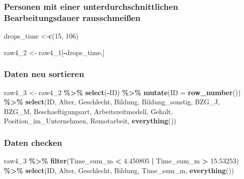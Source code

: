 \documentclass[
]{article}
\newenvironment{Shaded}{\begin{snugshade}}{\end{snugshade}}
\newcommand{\AttributeTok}[1]{\textcolor[rgb]{0.13,0.29,0.53}{#1}}
\newcommand{\DecValTok}[1]{\textcolor[rgb]{0.00,0.00,0.81}{#1}}
\newcommand{\FloatTok}[1]{\textcolor[rgb]{0.00,0.00,0.81}{#1}}
\newcommand{\FunctionTok}[1]{\textcolor[rgb]{0.13,0.29,0.53}{\textbf{#1}}}
\newcommand{\NormalTok}[1]{#1}
\newcommand{\OtherTok}[1]{\textcolor[rgb]{0.56,0.35,0.01}{#1}}
\newcommand{\SpecialCharTok}[1]{\textcolor[rgb]{0.81,0.36,0.00}{\textbf{#1}}}
\begin{document}
\subsubsection{Personen mit einer unterdurchschnittlichen
Bearbeitungsdauer
rausschmeißen}\label{personen-mit-einer-unterdurchschnittlichen-bearbeitungsdauer-rausschmeiuxdfen}

\begin{Shaded}
\begin{Highlighting}[]
\NormalTok{drops\_time }\OtherTok{\textless{}{-}}\FunctionTok{c}\NormalTok{(}\DecValTok{15}\NormalTok{, }\DecValTok{106}\NormalTok{)}
\end{Highlighting}
\end{Shaded}

\begin{Shaded}
\begin{Highlighting}[]
\NormalTok{raw4\_2 }\OtherTok{\textless{}{-}}\NormalTok{ raw4\_1[}\SpecialCharTok{{-}}\NormalTok{drops\_time,]}
\end{Highlighting}
\end{Shaded}

\subsubsection{Daten neu sortieren}\label{daten-neu-sortieren}

\begin{Shaded}
\begin{Highlighting}[]
\NormalTok{raw4\_3 }\OtherTok{\textless{}{-}}\NormalTok{ raw4\_2 }\SpecialCharTok{\%\textgreater{}\%} 
  \FunctionTok{select}\NormalTok{(}\SpecialCharTok{{-}}\NormalTok{ID) }\SpecialCharTok{\%\textgreater{}\%} 
  \FunctionTok{mutate}\NormalTok{(}\AttributeTok{ID =} \FunctionTok{row\_number}\NormalTok{()) }\SpecialCharTok{\%\textgreater{}\%} 
  \FunctionTok{select}\NormalTok{(ID, Alter, Geschlecht, Bildung, Bildung\_sonstig, BZG\_J, BZG\_M, Beschaeftigungsart, Arbeitszeitmodell, Gehalt, Position\_im\_Unternehmen, Remotarbeit, }\FunctionTok{everything}\NormalTok{())}
\end{Highlighting}
\end{Shaded}

\subsubsection{Daten checken}\label{daten-checken}

\begin{Shaded}
\begin{Highlighting}[]
\NormalTok{raw4\_3 }\SpecialCharTok{\%\textgreater{}\%} 
  \FunctionTok{filter}\NormalTok{(Time\_sum\_m }\SpecialCharTok{\textless{}} \FloatTok{4.450805} \SpecialCharTok{|}\NormalTok{ Time\_sum\_m }\SpecialCharTok{\textgreater{}} \FloatTok{15.53253}\NormalTok{) }\SpecialCharTok{\%\textgreater{}\%} 
  \FunctionTok{select}\NormalTok{(ID, Alter, Geschlecht, Bildung, Time\_sum\_m, }\FunctionTok{everything}\NormalTok{())}
\end{Highlighting}
\end{Shaded}
\end{document}
